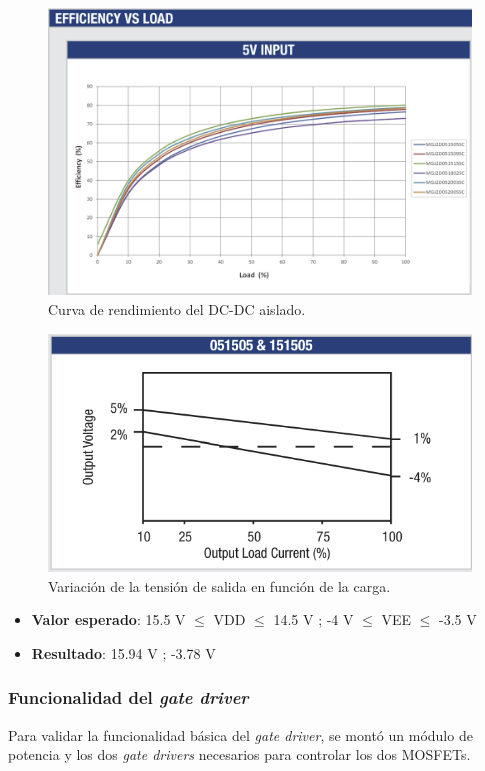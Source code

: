 \begin{figure}[H]
	\centering
	\includegraphics[width=0.7\linewidth]{fig/DCDC-eff}
	\caption{Curva de rendimiento del DC-DC aislado.}
\end{figure}

\begin{figure}[H]
	\centering
	\includegraphics[width=0.7\linewidth]{fig/DCDC-eff1}
	\caption{Variación de la tensión de salida en función de la carga.}
\end{figure}

\begin{itemize}
	\item \textbf{Valor esperado}: 15.5 V $\le$ VDD $\le$ 14.5 V ; -4 V $\le$ VEE $\le$ -3.5 V
	\item \textbf{Resultado}: 15.94 V ; -3.78 V
\end{itemize}

\subsubsection{Funcionalidad del \textit{gate driver}}
Para validar la funcionalidad básica del \textit{gate driver}, se montó un módulo de potencia y los dos \textit{gate drivers} necesarios para controlar los dos MOSFETs.

